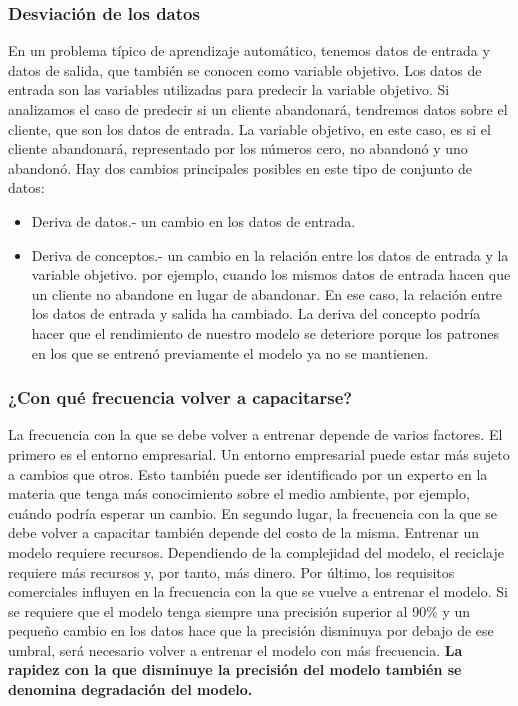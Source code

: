 \documentclass[10pt]{book}
\begin{document}
\subsubsection{Desviación de los datos}
En un problema típico de aprendizaje automático, tenemos datos de entrada y datos de salida, que también se conocen como variable objetivo. Los datos de entrada son las variables utilizadas para predecir la variable objetivo. Si analizamos el caso de predecir si un cliente abandonará, tendremos datos sobre el cliente, que son los datos de entrada. La variable objetivo, en este caso, es si el cliente abandonará, representado por los números cero, no abandonó y uno abandonó. Hay dos cambios principales posibles en este tipo de conjunto de datos:
\begin{itemize}
	\item Deriva de datos.- un cambio en los datos de entrada.
	\item Deriva de conceptos.- un cambio en la relación entre los datos de entrada y la variable objetivo. por ejemplo, cuando los mismos datos de entrada hacen que un cliente no abandone en lugar de abandonar. En ese caso, la relación entre los datos de entrada y salida ha cambiado. La deriva del concepto podría hacer que el rendimiento de nuestro modelo se deteriore porque los patrones en los que se entrenó previamente el modelo ya no se mantienen.
\end{itemize}

\subsubsection{¿Con qué frecuencia volver a capacitarse?}
La frecuencia con la que se debe volver a entrenar depende de varios factores. El primero es el entorno empresarial. Un entorno empresarial puede estar más sujeto a cambios que otros. Esto también puede ser identificado por un experto en la materia que tenga más conocimiento sobre el medio ambiente, por ejemplo, cuándo podría esperar un cambio. En segundo lugar, la frecuencia con la que se debe volver a capacitar también depende del costo de la misma. Entrenar un modelo requiere recursos. Dependiendo de la complejidad del modelo, el reciclaje requiere más recursos y, por tanto, más dinero. Por último, los requisitos comerciales influyen en la frecuencia con la que se vuelve a entrenar el modelo. Si se requiere que el modelo tenga siempre una precisión superior al 90\% y un pequeño cambio en los datos hace que la precisión disminuya por debajo de ese umbral, será necesario volver a entrenar el modelo con más frecuencia. \textbf{La rapidez con la que disminuye la precisión del modelo también se denomina degradación del modelo.}
\end{document}
